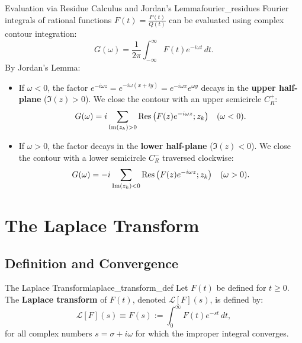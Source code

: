 \begin{proposition}{Evaluation via Residue Calculus and Jordan's Lemma}{fourier_residues}
Fourier integrals of rational functions $F(t) = \frac{P(t)}{Q(t)}$ can be evaluated using complex contour integration:
\begin{equation}
G(\omega) = \frac{1}{2\pi} \int_{-\infty}^\infty F(t) e^{-i\omega t}\, dt.
\end{equation}
By Jordan's Lemma:
\begin{itemize}
    \item If $\omega < 0$, the factor $e^{-i\omega z} = e^{-i\omega(x+iy)} = e^{-i\omega x} e^{\omega y}$ decays in the \textbf{upper half-plane} ($\Im(z) > 0$). We close the contour with an upper semicircle $C_R^+$:
    \begin{equation}
    G(\omega) = i \sum_{\operatorname{Im}(z_k) > 0} \operatorname{Res}\big(F(z) e^{-i\omega z}; z_k\big) \quad (\omega < 0).
    \end{equation}
    \item If $\omega > 0$, the factor decays in the \textbf{lower half-plane} ($\Im(z) < 0$). We close the contour with a lower semicircle $C_R^-$ traversed clockwise:
    \begin{equation}
    G(\omega) = -i \sum_{\operatorname{Im}(z_k) < 0} \operatorname{Res}\big(F(z) e^{-i\omega z}; z_k\big) \quad (\omega > 0).
    \end{equation}
\end{itemize}
\end{proposition}


\section{The Laplace Transform}

\subsection{Definition and Convergence}

\begin{definition}{The Laplace Transform}{laplace_transform_def}
Let $F(t)$ be defined for $t \ge 0$. The \textbf{Laplace transform} of $F(t)$, denoted $\mathcal{L}[F](s)$, is defined by:
\begin{equation}
\mathcal{L}[F](s) \equiv F(s) := \int_0^\infty F(t) e^{-st}\, dt,
\end{equation}
for all complex numbers $s = \sigma + i\omega$ for which the improper integral converges.
\end{definition}

